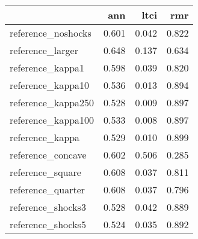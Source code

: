\begin{tabular}{lrrr}
\toprule
{} &    ann &   ltci &    rmr \\
\midrule
reference\_noshocks &  0.601 &  0.042 &  0.822 \\
reference\_larger   &  0.648 &  0.137 &  0.634 \\
reference\_kappa1   &  0.598 &  0.039 &  0.820 \\
reference\_kappa10  &  0.536 &  0.013 &  0.894 \\
reference\_kappa250 &  0.528 &  0.009 &  0.897 \\
reference\_kappa100 &  0.533 &  0.008 &  0.897 \\
reference\_kappa    &  0.529 &  0.010 &  0.899 \\
reference\_concave  &  0.602 &  0.506 &  0.285 \\
reference\_square   &  0.608 &  0.037 &  0.811 \\
reference\_quarter  &  0.608 &  0.037 &  0.796 \\
reference\_shocks3  &  0.528 &  0.042 &  0.889 \\
reference\_shocks5  &  0.524 &  0.035 &  0.892 \\
\bottomrule
\end{tabular}
